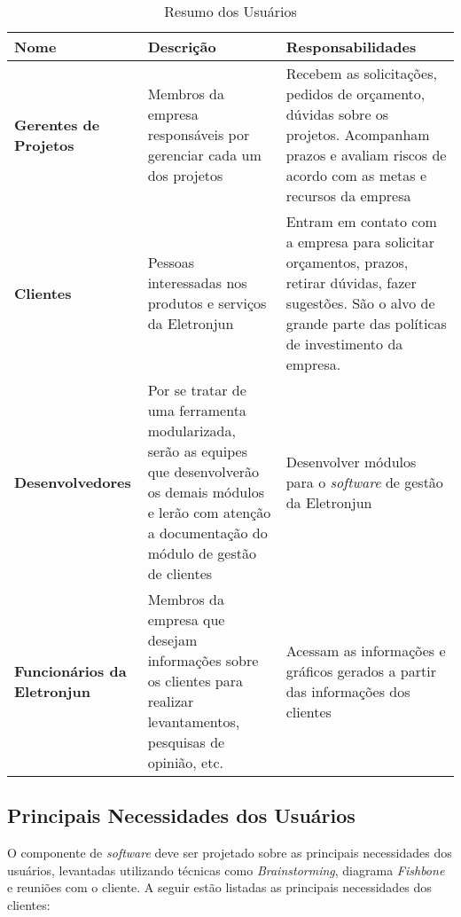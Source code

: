       \begin{table}[!htbp]
        \centering
        \caption{Resumo dos Usuários}
        \label{Resumo dos Usuários}
        \begin{tabularx}{0.9\textwidth}{|s|s|t|}
          \hline
            \textbf{Nome}                   &     \textbf{Descrição}     &   \textbf{Responsabilidades} \\ \hline
            \textbf{Gerentes de Projetos}   &  Membros da empresa responsáveis por gerenciar cada um dos projetos  &  Recebem as solicitações, pedidos de orçamento, dúvidas sobre os projetos. Acompanham prazos e avaliam riscos de acordo com as metas e recursos da empresa  \\ \hline
            \textbf{Clientes}               & Pessoas interessadas nos produtos e serviços da Eletronjun & Entram em contato com a empresa para solicitar orçamentos, prazos, retirar dúvidas, fazer sugestões. São o alvo de grande parte das políticas de investimento da empresa.   \\ \hline
            \textbf{Desenvolvedores}        & Por se tratar de uma ferramenta modularizada, serão as equipes que desenvolverão os demais módulos e lerão com atenção a documentação do módulo de gestão de clientes & Desenvolver módulos para o \textit{software} de gestão da Eletronjun \\ \hline
            \textbf{Funcionários da Eletronjun} & Membros da empresa que desejam informações sobre os clientes para realizar levantamentos, pesquisas de opinião, etc. & Acessam as informações e gráficos gerados a partir das informações dos clientes \\ \hline
        \end{tabularx}
      \end{table}

    \subsection{Principais Necessidades dos Usuários}
O componente de \textit{software} deve ser projetado sobre as principais necessidades dos usuários, levantadas utilizando técnicas como \textit{Brainstorming}, diagrama \textit{Fishbone} e reuniões com o cliente. A seguir estão listadas as principais necessidades dos clientes:


